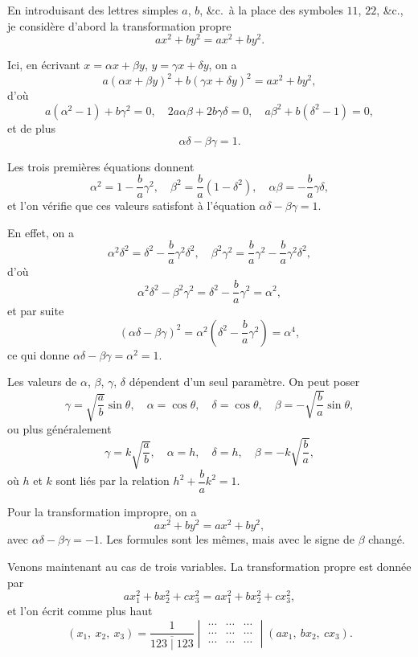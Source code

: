 \documentclass[12pt,a4paper]{article}
\begin{document}
En introduisant des lettres simples $a$, $b$, \&c.\ \`{a} la place des symboles $11$, $22$, \&c., je consid\`{e}re d'abord la transformation propre
\[
ax^2 + by^2 = ax^2 + by^2.
\]

Ici, en \'{e}crivant $x = \alpha x + \beta y$, $y = \gamma x + \delta y$, on a
\[
a(\alpha x + \beta y)^2 + b(\gamma x + \delta y)^2 = ax^2 + by^2,
\]
d'o\`{u}
\[
a(\alpha^2 - 1) + b\gamma^2 = 0,\quad
2a\alpha\beta + 2b\gamma\delta = 0,\quad
a\beta^2 + b(\delta^2 - 1) = 0,
\]
et de plus
\[
\alpha\delta - \beta\gamma = 1.
\]

Les trois premi\`{e}res \'{e}quations donnent
\[
\alpha^2 = 1 - \frac{b}{a}\gamma^2,\quad
\beta^2 = \frac{b}{a}(1 - \delta^2),\quad
\alpha\beta = -\frac{b}{a}\gamma\delta,
\]
et l'on v\'{e}rifie que ces valeurs satisfont \`{a} l'\'{e}quation $\alpha\delta - \beta\gamma = 1$.

\newpage
\setcounter{page}{211}

En effet, on a
\[
\alpha^2 \delta^2 = \delta^2 - \frac{b}{a}\gamma^2\delta^2,\quad
\beta^2 \gamma^2 = \frac{b}{a}\gamma^2 - \frac{b}{a}\gamma^2\delta^2,
\]
d'o\`{u}
\[
\alpha^2\delta^2 - \beta^2\gamma^2 = \delta^2 - \frac{b}{a}\gamma^2 = \alpha^2,
\]
et par suite
\[
(\alpha\delta - \beta\gamma)^2 = \alpha^2(\delta^2 - \frac{b}{a}\gamma^2) = \alpha^4,
\]
ce qui donne $\alpha\delta - \beta\gamma = \alpha^2 = 1$.

Les valeurs de $\alpha$, $\beta$, $\gamma$, $\delta$ d\'{e}pendent d'un seul param\`{e}tre. On peut poser
\[
\gamma = \sqrt{\frac{a}{b}}\sin\theta,\quad
\alpha = \cos\theta,\quad
\delta = \cos\theta,\quad
\beta = -\sqrt{\frac{b}{a}}\sin\theta,
\]
ou plus g\'{e}n\'{e}ralement
\[
\gamma = k\sqrt{\frac{a}{b}},\quad
\alpha = h,\quad
\delta = h,\quad
\beta = -k\sqrt{\frac{b}{a}},
\]
o\`{u} $h$ et $k$ sont li\'{e}s par la relation $h^2 + \dfrac{b}{a}k^2 = 1$.

Pour la transformation impropre, on a
\[
ax^2 + by^2 = ax^2 + by^2,
\]
avec $\alpha\delta - \beta\gamma = -1$. Les formules sont les m\^{e}mes, mais avec le signe de $\beta$ chang\'{e}.

Venons maintenant au cas de trois variables. La transformation propre est donn\'{e}e par
\[
ax_1^2 + bx_2^2 + cx_3^2 = ax_1^2 + bx_2^2 + cx_3^2,
\]
et l'on \'{e}crit comme plus haut
\[
(x_1,\ x_2,\ x_3) = \frac{1}{\overline{123 \mid 123}}
\begin{vmatrix}
\cdots & \cdots & \cdots \\
\cdots & \cdots & \cdots \\
\cdots & \cdots & \cdots
\end{vmatrix}
(ax_1,\ bx_2,\ cx_3).
\]
\end{document}
